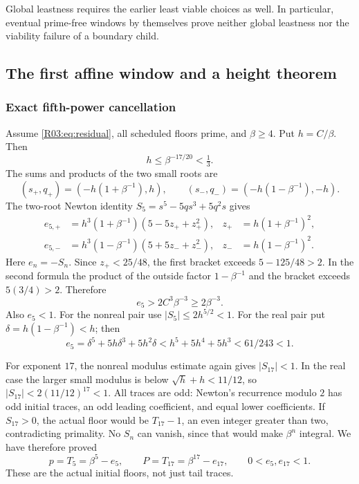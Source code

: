 \documentclass[11pt,a4paper]{article}
\theoremstyle{definition}\newtheorem{definition}[theorem]{Definition}
\theoremstyle{remark}\newtheorem{remark}[theorem]{Remark}
\begin{document}
Global leastness requires the earlier least viable choices as well.
In particular, eventual prime-free windows by themselves prove
neither global leastness nor the viability failure of a boundary child.

\subsection{The first affine window and a height theorem}\label{R03:sec:height}

\subsubsection{Exact fifth-power cancellation}

Assume \eqref{R03:eq:residual}, all scheduled floors prime, and $\beta\ge4$.
Put $h=C/\beta$. Then
\begin{equation}\label{R03:eq:h}
 h\le\beta^{-17/20}<\tfrac13.
\end{equation}
The sums and products of the two small roots are
\[
 (s_+,q_+)=(-h(1+\beta^{-1}),h),\qquad
 (s_-,q_-)=(-h(1-\beta^{-1}),-h).
\]
The two-root Newton identity $S_5=s^5-5qs^3+5q^2s$ gives
\begin{equation}\label{R03:eq:e5}
 \begin{aligned}
 e_{5,+}&=h^3(1+\beta^{-1})(5-5z_++z_+^2),
 &z_+&=h(1+\beta^{-1})^2,\\
 e_{5,-}&=h^3(1-\beta^{-1})(5+5z_-+z_-^2),
 &z_-&=h(1-\beta^{-1})^2.
 \end{aligned}
\end{equation}
Here $e_n=-S_n$. Since $z_+<25/48$, the first bracket exceeds
$5-125/48>2$. In the second formula the product of the outside
factor $1-\beta^{-1}$ and the bracket exceeds $5(3/4)>2$.
Therefore
\begin{equation}\label{R03:eq:e5lower}
 e_5>2C^3\beta^{-3}\ge2\beta^{-3}.
\end{equation}
Also $e_5<1$. For the nonreal pair use
$|S_5|\le2h^{5/2}<1$. For the real pair put
$\delta=h(1-\beta^{-1})<h$; then
\[
 e_5=\delta^5+5h\delta^3+5h^2\delta
 <h^5+5h^4+5h^3<61/243<1.
\]

For exponent $17$, the nonreal modulus estimate again gives
$|S_{17}|<1$. In the real case the larger small modulus is below
$\sqrt h+h<11/12$, so $|S_{17}|<2(11/12)^{17}<1$.
All traces are odd: Newton's recurrence modulo $2$ has odd initial
traces, an odd leading coefficient, and equal lower coefficients.
If $S_{17}>0$, the actual floor would be $T_{17}-1$, an even integer
greater than two, contradicting primality. No $S_n$ can vanish,
since that would make $\beta^n$ integral. We have therefore proved
\begin{equation}\label{R03:eq:initial-primes}
 p=T_5=\beta^5-e_5,\qquad P=T_{17}=\beta^{17}-e_{17},
 \qquad 0<e_5,e_{17}<1.
\end{equation}
These are the actual initial floors, not just tail traces.
\end{document}
